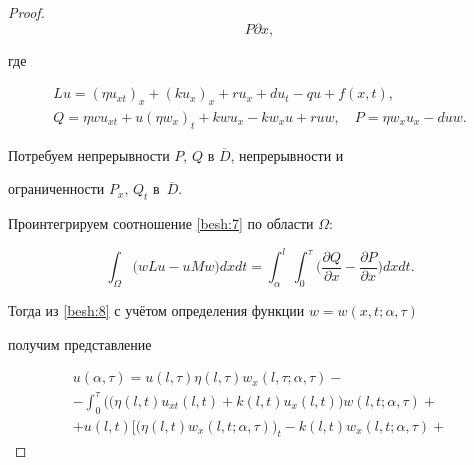 \begin{proof}
\begin{equation}
{P}{\partial x},

\label{besh:7}

\end{equation}

где

\begin{gather*}

Lu=(\eta u_{xt})_{x}+(ku_{x})_{x} +ru_{x}+ du_{t} - qu + f(x,t),

\\

Q =\eta w u_{xt}+u(\eta w_{x})_{t} +kw u_{x}-k w_{x}u+ru w,

\quad 

P=\eta w_{x} u_{x}-duw.

\end{gather*}

Потребуем непрерывности $P$, $Q$ в $\overline{D}$, непрерывности и

ограниченности $P_{x}$, $Q_{t}$ в~$\overline{D}$.



Проинтегрируем соотношение \eqref{besh:7} по области $\Omega$:

\begin{equation}

\int_{\Omega}\big(w Lu - uMw\big)dxdt =

\int^{l}_{\alpha}\int^{\tau}_{0}\Big(\frac{\partial Q}{\partial x} -

\frac{\partial P}{\partial x}\Big)dxdt.

\label{besh:8}

\end{equation}

Тогда из \eqref{besh:8} с учётом определения функции $w=w(x,t; \alpha,\tau)$

получим представление

\begin{multline}

u(\alpha,\tau) = u(l,\tau)\eta(l,\tau)w_{x}(l,\tau;\alpha,\tau) -

\\

-\int^{\tau}_0\Big(\big(\eta(l,t)u_{xt}(l,t)+

k(l,t)u_{x}(l,t)\big)w(l,t;\alpha,\tau)+

\\

+u(l,t) \Big[\big(\eta(l,t)w_{x}(l,t;\alpha,\tau)\big)_{t}-

k(l,t)w_{x}(l,t;\alpha,\tau)+


\end{multline}
\end{proof}
